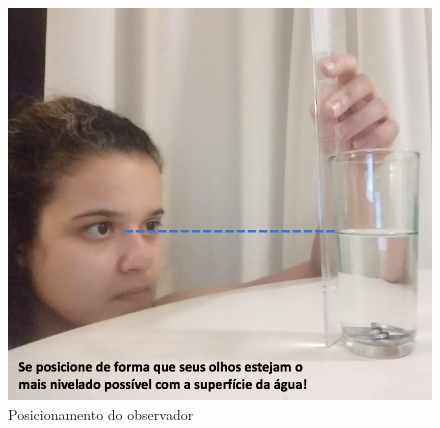\begin{figure}[!hbt]
\centering
\includegraphics[height=0.28\paperheight]{Figuras_exp2/Foto2.jpg}
\caption{\label{fig:observador} Posicionamento do observador}
\end{figure}
